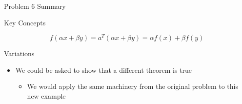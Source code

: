 \begin{summary}{Problem 6 Summary}
\begin{statement}{Key Concepts}
\begin{itemize}
\begin{equation*}
                f(\alpha x + \beta y) = a^{T}(\alpha x + \beta y) = \alpha f(x) + \beta f(y)
            \end{equation*}
        \end{itemize}
    \end{statement}
    \begin{statement}{Variations}
        \begin{itemize}
            \item We could be asked to show that a different theorem is true
            \begin{itemize}
                \item We would apply the same machinery from the original problem to this new example
            \end{itemize}
        \end{itemize}
    \end{statement}
\end{summary}